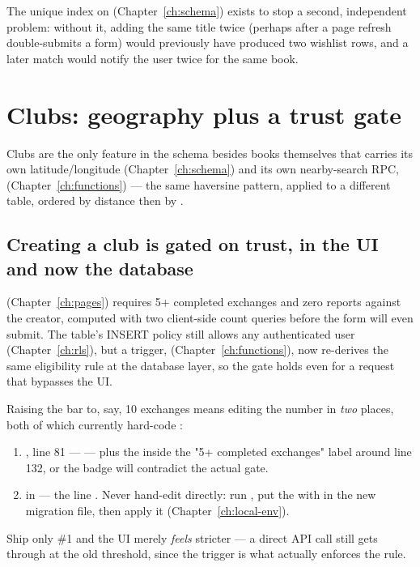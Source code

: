 The unique index on  (Chapter~\ref{ch:schema}) exists to stop a second, independent problem: without it, adding the same title twice (perhaps after a page refresh double-submits a form) would previously have produced two wishlist rows, and a later match would notify the user twice for the same book.

\section{Clubs: geography plus a trust gate}

Clubs are the only feature in the schema besides books themselves that carries its own latitude/longitude (Chapter~\ref{ch:schema}) and its own nearby-search RPC,  (Chapter~\ref{ch:functions}) — the same haversine pattern, applied to a different table, ordered by distance then by .

\subsection*{Creating a club is gated on trust, in the UI and now the database}

 (Chapter~\ref{ch:pages}) requires 5+ completed exchanges and zero reports against the creator, computed with two client-side count queries before the form will even submit. The  table's INSERT policy still allows any authenticated user (Chapter~\ref{ch:rls}), but a  trigger,  (Chapter~\ref{ch:functions}), now re-derives the same eligibility rule at the database layer, so the gate holds even for a request that bypasses the UI.

\begin{olkhowto}
Raising the bar to, say, 10 exchanges means editing the number in \emph{two} places, both of which currently hard-code :
\begin{enumerate}
  \item {}, line 81 —  — plus the  inside the "5+ completed exchanges" label around line 132, or the badge will contradict the actual gate.
  \item {} in  — the line . Never hand-edit  directly: run , put the  with  in the new migration file, then apply it (Chapter~\ref{ch:local-env}).
\end{enumerate}
Ship only \#1 and the UI merely \emph{feels} stricter — a direct API call still gets through at the old threshold, since the trigger is what actually enforces the rule.
\end{olkhowto}

